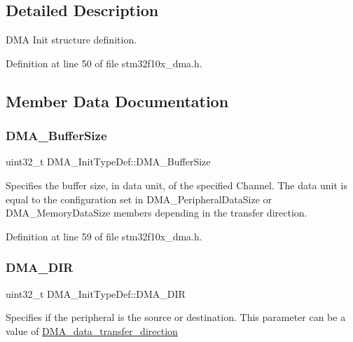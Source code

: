 \subsection{Detailed Description}
D\+MA Init structure definition. 

Definition at line 50 of file stm32f10x\+\_\+dma.\+h.



\subsection{Member Data Documentation}
\mbox{\label{struct_d_m_a___init_type_def_a999df57215b28b3b1b3b6836c4952ca5}} 
\subsubsection{\texorpdfstring{D\+M\+A\+\_\+\+Buffer\+Size}{DMA\_BufferSize}}
{\footnotesize\ttfamily uint32\+\_\+t D\+M\+A\+\_\+\+Init\+Type\+Def\+::\+D\+M\+A\+\_\+\+Buffer\+Size}

Specifies the buffer size, in data unit, of the specified Channel. The data unit is equal to the configuration set in D\+M\+A\+\_\+\+Peripheral\+Data\+Size or D\+M\+A\+\_\+\+Memory\+Data\+Size members depending in the transfer direction. 

Definition at line 59 of file stm32f10x\+\_\+dma.\+h.

\mbox{\label{struct_d_m_a___init_type_def_a91b47435ccf4a40efa97bbbe631789e1}} 
\subsubsection{\texorpdfstring{D\+M\+A\+\_\+\+D\+IR}{DMA\_DIR}}
{\footnotesize\ttfamily uint32\+\_\+t D\+M\+A\+\_\+\+Init\+Type\+Def\+::\+D\+M\+A\+\_\+\+D\+IR}

Specifies if the peripheral is the source or destination. This parameter can be a value of \hyperlink{group___d_m_a__data__transfer__direction}{D\+M\+A\+\_\+data\+\_\+transfer\+\_\+direction} 

